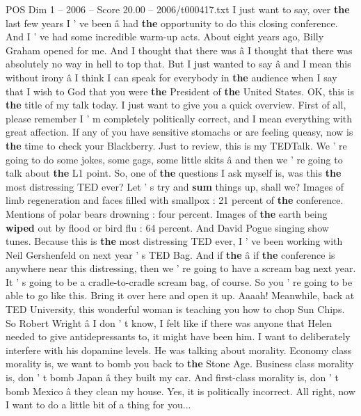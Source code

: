\begin{textsample}{POS Dim 1 – 2006 – Score 20.00 – 2006/t000417.txt}  \label{ex:f1_pos_013}
I just want to say, over \textbf{the} last few years I ' ve been â had \textbf{the} opportunity to do this closing conference.
And I ' ve had some incredible warm-up acts.
About eight years ago, Billy Graham opened for me.
And I thought that there was â I thought that there was absolutely no way in hell to top that.
But I just wanted to say â and I mean this without irony â I think I can speak for everybody in \textbf{the} audience when I say that I wish to God that you were \textbf{the} President of \textbf{the} United States.
OK, this is \textbf{the} title of my talk today.
I just want to give you a quick overview.
First of all, please remember I ' m completely politically correct, and I mean everything with great affection.
If any of you have sensitive stomachs or are feeling queasy, now is \textbf{the} time to check your Blackberry.
Just to review, this is my TEDTalk.
We ' re going to do some jokes, some gags, some little skits â and then we ' re going to talk about \textbf{the} L1 point.
So, one of \textbf{the} questions I ask myself is, was this \textbf{the} most distressing TED ever?
Let ' s try and \textbf{sum} things up, shall we?
Images of limb regeneration and faces filled with smallpox : 21 percent of \textbf{the} conference.
Mentions of polar bears drowning : four percent.
Images of \textbf{the} earth being \textbf{wiped} out by flood or bird flu : 64 percent.
And David Pogue singing show tunes.
Because this is \textbf{the} most distressing TED ever, I ' ve been working with Neil Gershenfeld on next year ' s TED Bag.
And if \textbf{the} â if \textbf{the} conference is anywhere near this distressing, then we ' re going to have a scream bag next year.
It ' s going to be a cradle-to-cradle scream bag, of course.
So you ' re going to be able to go like this.
Bring it over here and open it up.
Aaaah!
Meanwhile, back at TED University, this wonderful woman is teaching you how to chop Sun Chips.
So Robert Wright â I don ' t know, I felt like if there was anyone that Helen needed to give antidepressants to, it might have been him.
I want to deliberately interfere with his dopamine levels.
He was talking about morality.
Economy class morality is, we want to bomb you back to \textbf{the} Stone Age.
Business class morality is, don ' t bomb Japan â they built my car.
And first-class morality is, don ' t bomb Mexico â they clean my house.
Yes, it is politically incorrect.
All right, now I want to do a little bit of a thing for you...

\end{textsample}
